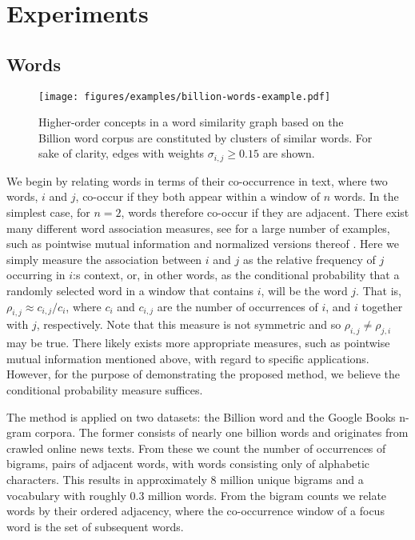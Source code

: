 \documentclass{sig-alternate}
\newcommand{\rn}[1]{\rho_{#1}}
\newcommand{\sy}[1]{\sigma_{#1}}
\begin{document}
\section{Experiments}

\subsection{Words}
\label{subsec:words}

\begin{figure*}
\begin{center}
\texttt{[image: figures/examples/billion-words-example.pdf]}
\end{center}
\caption{Higher-order concepts in a word similarity graph based on the Billion word corpus are constituted by clusters of similar words. For sake of clarity, edges with weights $\sy{i,j} \geq 0.15$ are shown.}
\label{fig:billion-words-example}
\end{figure*}

We begin by relating words in terms of their co-occurrence in text, where two words, $i$ and $j$, co-occur if they both
appear within a window of $n$ words. In the simplest case, for $n = 2$, words therefore co-occur if they are adjacent.
There exist many different word association measures, see \cite{Pecina08} for a large number of examples, such as
pointwise mutual information \cite{Church90} and normalized versions thereof \cite{Bouma09}. Here we simply measure the
association between $i$ and $j$ as the relative frequency of $j$ occurring in $i$:s context, or, in other words, as the
conditional probability that a randomly selected word in a window that contains $i$, will be the word $j$. That is, $\rn{i,j}
\approx c_{i,j}/{c_i}$, where $c_i$ and $c_{i,j}$ are the number of occurrences of $i$, and $i$ together with $j$,
respectively. Note that this measure is not symmetric and so $\rn{i,j} \neq \rn{j,i}$ may be true. There likely exists more
appropriate measures, such as pointwise mutual information mentioned above, with regard to specific applications.
However, for the purpose of demonstrating the proposed method, we believe the conditional probability measure suffices.

The method is applied on two datasets: the Billion word \cite{Chelba13} and
the Google Books n-gram \cite{Michel10,Lin12} corpora. The former consists of
nearly one billion words and originates from crawled online news texts. From
these we count the number of occurrences of bigrams, pairs of adjacent words, with words consisting only
of alphabetic characters. This results in approximately 8 million unique
bigrams and a vocabulary with roughly 0.3 million words. From the bigram counts
we relate words by their ordered adjacency, where the co-occurrence window of a focus word
is the set of subsequent words.
\end{document}
